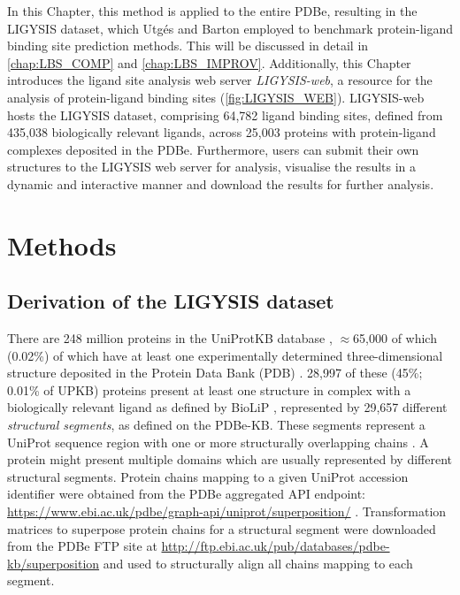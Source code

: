 In this Chapter, this method is applied to the entire PDBe, resulting in the LIGYSIS dataset, which Utgés and Barton \cite{UTGES_2024_LBSCOMP} employed to benchmark protein-ligand binding site prediction methods. This will be discussed in detail in \autoref{chap:LBS_COMP} and \autoref{chap:LBS_IMPROV}. Additionally, this Chapter introduces the ligand site analysis web server \textit{LIGYSIS-web}, a resource for the analysis of protein-ligand binding sites (\autoref{fig:LIGYSIS_WEB}). LIGYSIS-web hosts the LIGYSIS dataset, comprising 64,782 ligand binding sites, defined from 435,038 biologically relevant ligands, across 25,003 proteins with protein-ligand complexes deposited in the PDBe. Furthermore, users can submit their own structures to the LIGYSIS web server for analysis, visualise the results in a dynamic and interactive manner and download the results for further analysis.

\section{Methods}

\subsection{Derivation of the LIGYSIS dataset}

There are 248 million proteins in the UniProtKB database \cite{UNIPROT_2020_UNIPROT}, $\approx$65,000 of which (0.02\%) of which have at least one experimentally determined three-dimensional structure deposited in the Protein Data Bank (PDB) \cite{ARMSTRONG_2020_PDBE}. 28,997 of these (45\%; 0.01\% of UPKB) proteins present at least one structure in complex with a biologically relevant ligand as defined by BioLiP \cite{YANG_2013_BIOLIP}, represented by 29,657 different \textit{structural segments}, as defined on the PDBe-KB. These segments represent a UniProt sequence region with one or more structurally overlapping chains  \cite{ELLAWAY_2024_CONFORMATIONS}. A protein might present multiple domains which are usually represented by different structural segments. Protein chains mapping to a given UniProt accession identifier were obtained from the PDBe aggregated API endpoint: \url{https://www.ebi.ac.uk/pdbe/graph-api/uniprot/superposition/} \cite{PDBEKB_2019_PDBEKB}. Transformation matrices to superpose protein chains for a structural segment were downloaded from the PDBe FTP site at \url{http://ftp.ebi.ac.uk/pub/databases/pdbe-kb/superposition} \cite{PDBE_2022_PDBEKB} and used to structurally align all chains mapping to each segment.

